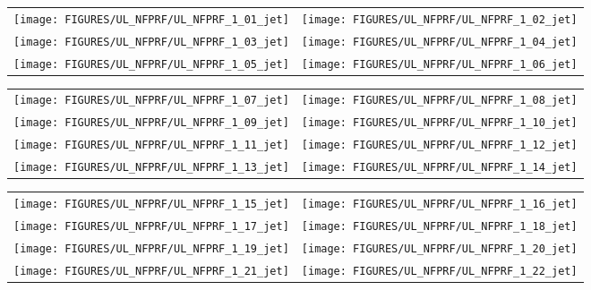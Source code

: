 \begin{figure}[h!]
\begin{tabular*}{\textwidth}{l@{\extracolsep{\fill}}r}
\texttt{[image: FIGURES/UL\_NFPRF/UL\_NFPRF\_1\_01\_jet]} &
\texttt{[image: FIGURES/UL\_NFPRF/UL\_NFPRF\_1\_02\_jet]} \\
\texttt{[image: FIGURES/UL\_NFPRF/UL\_NFPRF\_1\_03\_jet]} &
\texttt{[image: FIGURES/UL\_NFPRF/UL\_NFPRF\_1\_04\_jet]} \\
\texttt{[image: FIGURES/UL\_NFPRF/UL\_NFPRF\_1\_05\_jet]} &
\texttt{[image: FIGURES/UL\_NFPRF/UL\_NFPRF\_1\_06\_jet]}
\end{tabular*}
\label{UL_NFPRF_jet_1}
\end{figure}

\newpage

\begin{figure}[p]
\begin{tabular*}{\textwidth}{l@{\extracolsep{\fill}}r}
\texttt{[image: FIGURES/UL\_NFPRF/UL\_NFPRF\_1\_07\_jet]} &
\texttt{[image: FIGURES/UL\_NFPRF/UL\_NFPRF\_1\_08\_jet]} \\
\texttt{[image: FIGURES/UL\_NFPRF/UL\_NFPRF\_1\_09\_jet]} &
\texttt{[image: FIGURES/UL\_NFPRF/UL\_NFPRF\_1\_10\_jet]} \\
\texttt{[image: FIGURES/UL\_NFPRF/UL\_NFPRF\_1\_11\_jet]} &
\texttt{[image: FIGURES/UL\_NFPRF/UL\_NFPRF\_1\_12\_jet]} \\
\texttt{[image: FIGURES/UL\_NFPRF/UL\_NFPRF\_1\_13\_jet]} &
\texttt{[image: FIGURES/UL\_NFPRF/UL\_NFPRF\_1\_14\_jet]}
\end{tabular*}
\label{UL_NFPRF_jet_2}
\end{figure}

\begin{figure}[p]
\begin{tabular*}{\textwidth}{l@{\extracolsep{\fill}}r}
\texttt{[image: FIGURES/UL\_NFPRF/UL\_NFPRF\_1\_15\_jet]} &
\texttt{[image: FIGURES/UL\_NFPRF/UL\_NFPRF\_1\_16\_jet]} \\
\texttt{[image: FIGURES/UL\_NFPRF/UL\_NFPRF\_1\_17\_jet]} &
\texttt{[image: FIGURES/UL\_NFPRF/UL\_NFPRF\_1\_18\_jet]} \\
\texttt{[image: FIGURES/UL\_NFPRF/UL\_NFPRF\_1\_19\_jet]} &
\texttt{[image: FIGURES/UL\_NFPRF/UL\_NFPRF\_1\_20\_jet]} \\
\texttt{[image: FIGURES/UL\_NFPRF/UL\_NFPRF\_1\_21\_jet]} &
\texttt{[image: FIGURES/UL\_NFPRF/UL\_NFPRF\_1\_22\_jet]}
\end{tabular*}
\label{UL_NFPRF_jet_3}
\end{figure}

